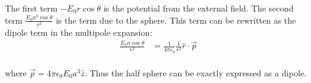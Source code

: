 \documentclass[10pt]{article} %
\begin{document}
The first term $-E_0r\cos\theta$ is the potential from the external field. The second term $\frac{E_0a^3\cos\theta}{r^2}$ is the term due
to the sphere. This term can be rewritten as the dipole term in the multipole expansion:\\

\begin{align*}
  \frac{E_0a\cos\theta}{r^2} &= \frac{1}{4\pi\epsilon_0}\frac{1}{r^2} \hat{r} \cdot \vec{p}\\
\end{align*}

where $\vec{p} = 4\pi\epsilon_0E_0 a^3 \hat{z}$. Thus the half sphere can be exactly expressed as a dipole.\\
\end{document}
